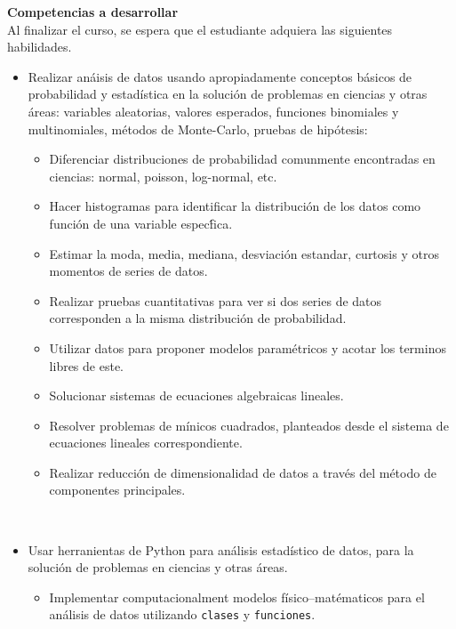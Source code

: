 \documentclass[letterpaper,10pt,onecolumn]{article}
\begin{document}
\noindent\textbf{\large {} \quad Competencias a
  desarrollar}\\[-0.2cm] 


\noindent\normalsize Al finalizar el curso, se espera que el
estudiante adquiera las siguientes habilidades.

\begin{itemize}
\item Realizar an\'aisis de datos usando apropiadamente conceptos b\'asicos de probabilidad y estad\'istica en la soluci\'on de problemas en ciencias y otras \'areas: variables aleatorias, valores esperados, funciones binomiales y multinomiales, m\'etodos de Monte-Carlo, pruebas de hip\'otesis:
 \begin{itemize}
  \item Diferenciar distribuciones de probabilidad comunmente encontradas en ciencias: normal, poisson, log-normal, etc.
  \item Hacer histogramas para identificar la distribuci\'on de los datos como funci\'on de una variable espec\'fica.
  \item Estimar la moda, media, mediana, desviaci\'on estandar, curtosis y otros momentos de series de datos.
  \item Realizar pruebas cuantitativas para ver si dos series de datos corresponden a la misma distribuci\'on de probabilidad.
  \item Utilizar datos para proponer modelos param\'etricos y acotar los terminos libres de este. 
  \item Solucionar sistemas de ecuaciones algebraicas lineales. 
  \item Resolver problemas de m\'inicos cuadrados, planteados desde el sistema de ecuaciones lineales correspondiente.
  \item Realizar reducci\'on de dimensionalidad de datos a trav\'es del m\'etodo de componentes principales.
 \end{itemize}
\\[-0.6cm]   
\item Usar herranientas de Python para an\'alisis estad\'istico de datos, para la soluci\'on de problemas en ciencias y otras \'areas.\\[-0.6cm]
\begin{itemize}
   \item Implementar computacionalment modelos f\'isico--mat\'ematicos para el an\'alisis de datos utilizando \texttt{clases} y \texttt{funciones}.\\[-0.5cm]

\end{itemize}
\end{itemize}
\end{document}
